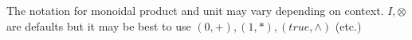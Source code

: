 The notation for monoidal product and unit may vary depending on context. $I, \otimes$ are defaults but it may be best to use $(0,+),(1,*),(true, \land)$ (etc.)
